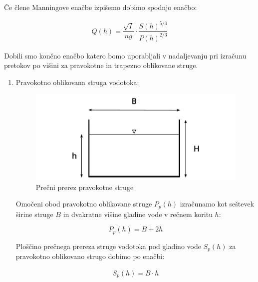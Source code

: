 Če člene Manningove enačbe izpišemo dobimo spodnjo enačbo:

\begin{ceqn}
	\begin{align}
	Q(h) = \dfrac{\sqrt{I}}{ng} \cdot \dfrac{S(h)^{5/3}}{P(h)^{2/3}} \label{eq:ManningovaEnacba}
	\end{align}
\end{ceqn}


Dobili smo končno enačbo katero bomo uporabljali v nadaljevanju pri izračunu pretokov po višini za pravokotne in trapezno oblikovane struge.



\begin{enumerate}
	\item Pravokotno oblikovana struga vodotoka:
	
	\begin{figure}[H]
		\begin{centering}
			\includegraphics{slike/konsumpcijska_krivulja/rectangularChannel.pdf}		
			\caption{Prečni prerez pravokotne struge}\label{fig:pravokotna struga}
		\end{centering}
	\end{figure}
	

	Omočeni obod pravokotno oblikovane struge $P_p(h)$ izračunamo kot seštevek širine struge $B$ in dvakratne višine gladine vode v rečnem koritu $h$:
	
	\begin{ceqn}
	\begin{equation}
	P_{p}(h) = B + 2h
	\end{equation}
	\end{ceqn}
	
	Ploščino prečnega prereza struge vodotoka pod gladino vode $S_p(h)$ za pravokotno oblikovano strugo dobimo po enačbi:
	
	\begin{ceqn}
	\begin{align}
	S_{p}(h) = B \cdot h
	\end{align}
	\end{ceqn}
	

\end{enumerate}
